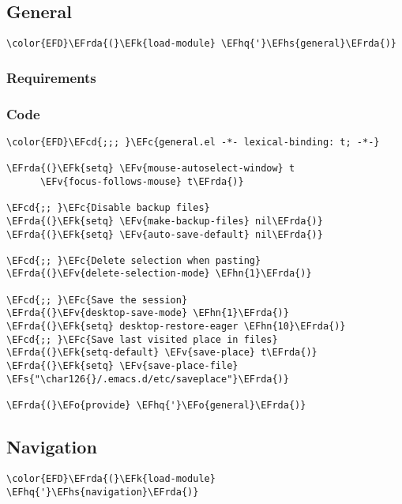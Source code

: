\documentclass[a4wide,10pt]{article}
\newcommand{\EFc}[1]{\textcolor{EFc}{#1}} %
\newcommand{\EFcd}[1]{\textcolor{EFcd}{#1}} %
\newcommand{\EFs}[1]{\textcolor{EFs}{#1}} %
\newcommand{\EFk}[1]{\textcolor{EFk}{#1}} %
\newcommand{\EFv}[1]{\textcolor{EFv}{#1}} %
\newcommand{\EFo}[1]{\textcolor{EFo}{#1}} %
\newcommand{\EFhn}[1]{\textcolor{EFhn}{\textbf{#1}}} %
\newcommand{\EFhq}[1]{\textcolor{EFhq}{#1}} %
\newcommand{\EFhs}[1]{\textcolor{EFhs}{#1}} %
\newcommand{\EFrda}[1]{\textcolor{EFrda}{#1}} %
\begin{document}
\subsection{General}
\label{sec:orge4251ba}
\begin{Code}
\begin{Verbatim}
\color{EFD}\EFrda{(}\EFk{load-module} \EFhq{'}\EFhs{general}\EFrda{)}
\end{Verbatim}
\end{Code}
\subsubsection{Requirements}
\label{sec:orgf78df47}
\subsubsection{Code}
\label{sec:orgc6e0684}
\begin{Code}
\begin{Verbatim}
\color{EFD}\EFcd{;;; }\EFc{general.el -*- lexical-binding: t; -*-}

\EFrda{(}\EFk{setq} \EFv{mouse-autoselect-window} t
      \EFv{focus-follows-mouse} t\EFrda{)}

\EFcd{;; }\EFc{Disable backup files}
\EFrda{(}\EFk{setq} \EFv{make-backup-files} nil\EFrda{)}
\EFrda{(}\EFk{setq} \EFv{auto-save-default} nil\EFrda{)}

\EFcd{;; }\EFc{Delete selection when pasting}
\EFrda{(}\EFv{delete-selection-mode} \EFhn{1}\EFrda{)}

\EFcd{;; }\EFc{Save the session}
\EFrda{(}\EFv{desktop-save-mode} \EFhn{1}\EFrda{)}
\EFrda{(}\EFk{setq} desktop-restore-eager \EFhn{10}\EFrda{)}
\EFcd{;; }\EFc{Save last visited place in files}
\EFrda{(}\EFk{setq-default} \EFv{save-place} t\EFrda{)}
\EFrda{(}\EFk{setq} \EFv{save-place-file} \EFs{"\char126{}/.emacs.d/etc/saveplace"}\EFrda{)}

\EFrda{(}\EFo{provide} \EFhq{'}\EFo{general}\EFrda{)}
\end{Verbatim}
\end{Code}

\subsection{Navigation}
\label{sec:org11280a9}
\begin{Code}
\begin{Verbatim}
\color{EFD}\EFrda{(}\EFk{load-module} \EFhq{'}\EFhs{navigation}\EFrda{)}
\end{Verbatim}
\end{Code}
\end{document}
